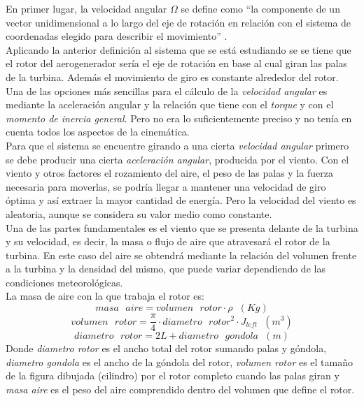 En primer lugar, la velocidad angular $\Omega$ se define como ``la componente de un vector unidimensional a lo largo del eje de rotación en relación con el sistema de coordenadas elegido para describir el movimiento'' \cite[p.~303]{cummings2004understanding}.\\

Aplicando la anterior definición al sistema que se está estudiando se se tiene que el rotor del aerogenerador sería el eje de rotación en base al cual giran las palas de la turbina. Además el movimiento de giro es constante alrededor del rotor.\\

Una de las opciones más sencillas para el cálculo de la \textit{velocidad angular} es mediante la aceleración angular y la relación que tiene con el \textit{torque} y con el \textit{momento de inercia general}. Pero no era lo suficientemente preciso y no tenía en cuenta todos los aspectos de la cinemática. \\
 
Para que el sistema se encuentre girando a una cierta \textit{velocidad angular} primero se debe producir una cierta \textit{aceleración angular}, producida por el viento. Con el viento y otros factores el rozamiento del aire, el peso de las palas y la fuerza necesaria para moverlas, se podría llegar a mantener una velocidad de giro óptima y así extraer la mayor cantidad de energía. Pero la velocidad del viento es aleatoria, aunque se considera su valor medio como constante.\\


Una de las partes fundamentales es el viento que se presenta delante de la turbina y su velocidad, es decir, la masa o flujo de aire que atravesará el rotor de la turbina. En este caso del aire se obtendrá mediante la relación del volumen frente a la turbina y la densidad del mismo, que puede variar dependiendo de las condiciones meteorológicas.\\

La masa de aire con la que trabaja el rotor es:
\begin{equation}
    masa \text{ } aire = volumen \text{ } rotor \cdot \rho \hspace{7pt} (Kg)
\label{def:masa_aire}
\end{equation}
\begin{equation}
    volumen \text{ } rotor = \dfrac{\pi}{4} \cdot diametro \text{ } rotor^2 \cdot J_{left} \hspace{7pt} (m^3) 
\end{equation}
\begin{equation}
     diametro \text{ } rotor = 2L + diametro \text{ } gondola \hspace{7pt} (m)
\end{equation}
Donde \textit{diametro rotor} es el ancho total del rotor sumando palas y góndola, \textit{diametro gondola} es el ancho de la góndola del rotor, \textit{volumen rotor} es el tamaño de la figura dibujada (cilindro) por el rotor completo cuando las palas giran y \textit{masa aire} es el peso del aire comprendido dentro del volumen que define el rotor.\\

